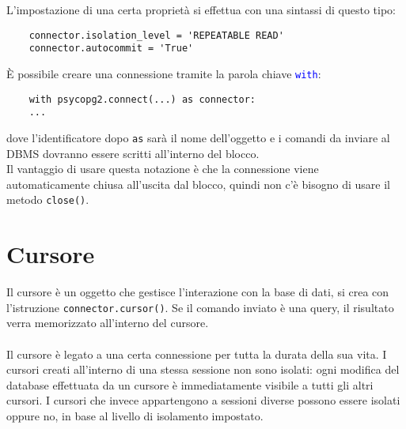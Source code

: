 \documentclass[12pt,a4paper]{book}
\begin{document}
	L'impostazione di una certa proprietà si effettua con una sintassi di questo tipo:
	\begin{lstlisting}
	connector.isolation_level = 'REPEATABLE READ'
	connector.autocommit = 'True'
	\end{lstlisting}
	È possibile creare una connessione tramite la parola chiave \textcolor{blue}{\texttt{with}}:
	\begin{lstlisting}
	with psycopg2.connect(...) as connector:
	...
	\end{lstlisting}
	dove l'identificatore dopo \texttt{as} sarà il nome dell'oggetto e i comandi da inviare al DBMS dovranno essere scritti all'interno del blocco.\\Il vantaggio di usare questa notazione è che la connessione viene automaticamente chiusa all'uscita dal blocco, quindi non c'è bisogno di usare il metodo \texttt{close()}.
	\section{Cursore}
	Il cursore è un oggetto che gestisce l'interazione con la base di dati, si crea con l'istruzione \texttt{connector.cursor()}. Se il comando inviato è una query, il risultato verra memorizzato all'interno del cursore.
	\paragraph{}Il cursore è legato a una certa connessione per tutta la durata della sua vita. I cursori creati all'interno di una stessa sessione non sono isolati: ogni modifica del database effettuata da un cursore è immediatamente visibile a tutti gli altri cursori. I cursori che invece appartengono a sessioni diverse possono essere isolati oppure no, in base al livello di isolamento impostato. 
\end{document}
